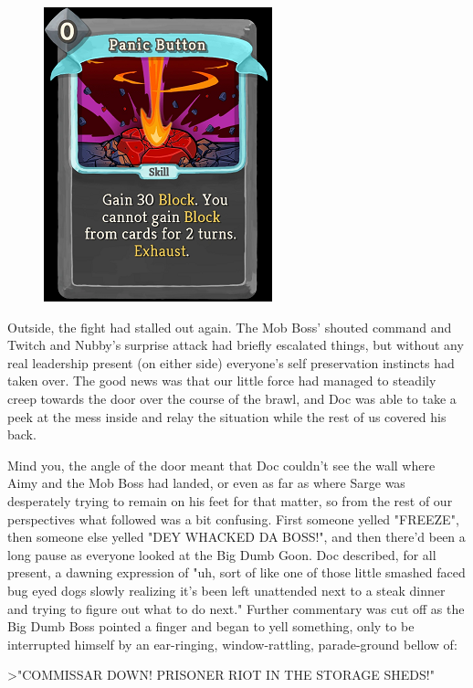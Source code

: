 \begin{figure}
	\begin{center}
		\includegraphics[width=\figwidth]{pics/21/51.png}
	\end{center}
\end{figure}
Outside, the fight had stalled out again. 
The Mob Boss' shouted command and Twitch and Nubby's surprise attack had briefly escalated things, but without any real leadership present (on either side) everyone's self preservation instincts had taken over. 
The good news was that our little force had managed to steadily creep towards the door over the course of the brawl, and Doc was able to take a peek at the mess inside and relay the situation while the rest of us covered his back. 


Mind you, the angle of the door meant that Doc couldn't see the wall where Aimy and the Mob Boss had landed, or even as far as where Sarge was desperately trying to remain on his feet for that matter, so from the rest of our perspectives what followed was a bit confusing. 
First someone yelled "FREEZE", then someone else yelled "DEY WHACKED DA BOSS!", and then there'd been a long pause as everyone looked at the Big Dumb Goon. 
Doc described, for all present, a dawning expression of "uh, sort of like one of those little smashed faced bug eyed dogs slowly realizing it's been left unattended next to a steak dinner and trying to figure out what to do next." Further commentary was cut off as the Big Dumb Boss pointed a finger and began to yell something, only to be interrupted himself by an ear-ringing, window-rattling, parade-ground bellow of: 


>"COMMISSAR DOWN! 
PRISONER RIOT IN THE STORAGE SHEDS!" 

